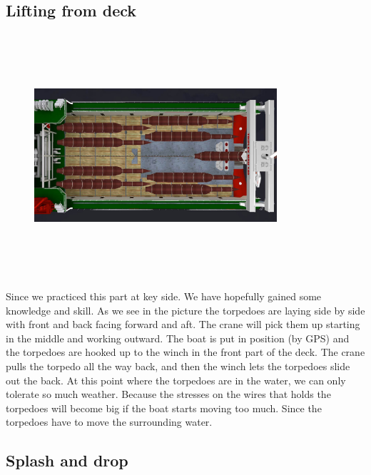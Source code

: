 \documentclass[DIV=calc, paper=a4, fontsize=13pt, twocolumn]{scrartcl}	 %
\begin{document}
\subsection*{Lifting from deck}
\begin{figure}[h]
\includegraphics[width=9cm,height=9cm]{Triplex_MDH_140.jpg}
\end{figure}
Since we practiced this part at key side. We have hopefully gained some knowledge and skill. As we see in the picture the torpedoes are laying side by side with front and back facing forward and aft. The crane will pick them up starting in the middle and working outward. The boat is put in position (by GPS) and the torpedoes are hooked up to the winch in the front part of the deck. The crane pulls the torpedo all the way back, and then the winch lets the torpedoes slide out the back. At this point where the torpedoes are in the water, we can only tolerate so much weather. Because the stresses on the wires that holds the torpedoes will become big if the boat starts moving too much. Since the torpedoes have to move the surrounding water. 
\subsection*{Splash and drop}
\end{document}
